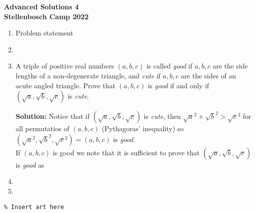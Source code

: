 \documentclass{article}
\begin{document}
\thispagestyle{empty}

\begin{center}
  \textbf{\Large Advanced Solutions 4}
  \\ \vspace{1em}
  \textbf{\large Stellenbosch Camp 2022}
  \\ \vspace{1em}
\end{center}

\bigskip

\begin{enumerate}[itemsep=\fill]

\item %
Problem statement


\item %


\item %
A triple of positive real numbers $(a,b,c)$ is called \textit{good} if $a,b,c$ are the side lengths of a non-degenerate triangle, and \textit{cute} if $a,b,c$ are the sides of an acute angled triangle. Prove that $(a,b,c)$ is \textit{good} if and only if $(\sqrt{a},\sqrt{b},\sqrt{c})$ is \textit{cute}. 

\textbf{Solution:} Notice that if $(\sqrt{a},\sqrt{b},\sqrt{c})$ is \textit{cute}, then $\sqrt{a}^2 + \sqrt{b}^2 > \sqrt{c}^2$ for all permutatios of $(a,b,c)$ (Pythagoras' inequality) so $(\sqrt{a}^2,\sqrt{b}^2,\sqrt{c}^2)=(a,b,c)$ is \textit{good}.\\

If $(a,b,c)$ is good we note that it is sufficient to prove that $(\sqrt{a},\sqrt{b},\sqrt{c})$ is \textit{good} as 


\item %


\item %

\end{enumerate}


\centering
\small
\begin{BVerbatim}
\end{BVerbatim}
\end{document}
